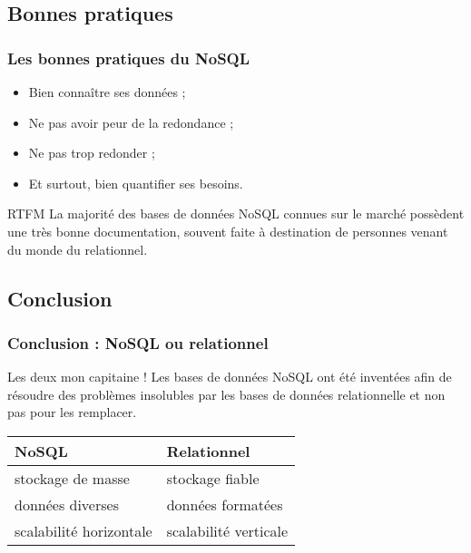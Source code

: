 	\subsection{Bonnes pratiques}
	\begin{frame}
		\frametitle{Les bonnes pratiques du NoSQL}

		\begin{itemize}
			\item Bien connaître ses données ;
			\item Ne pas avoir peur de la redondance ;
			\item Ne pas trop redonder ;
			\item Et surtout, bien quantifier ses besoins.
		\end{itemize}


		\begin{alertblock}{RTFM}
			La majorité des bases de données NoSQL connues sur le marché possèdent une très bonne documentation, souvent faite à destination de personnes venant du monde du relationnel.
		\end{alertblock}
	\end{frame}
	\subsection{Conclusion}
	\begin{frame}
		\frametitle{Conclusion : NoSQL ou relationnel}

		\begin{alertblock}{Les deux mon capitaine !}
			Les bases de données NoSQL ont été inventées afin de résoudre des problèmes insolubles par les bases de données relationnelle et non pas pour les remplacer.
		\end{alertblock}

		\vspace{20px}
		
		\begin{tabular}{|l|l|}
			\hline
			\textbf{NoSQL} & \textbf{Relationnel} \\ \hline\hline
			stockage de masse & stockage fiable \\ \hline
			données diverses & données formatées \\ \hline
			scalabilité horizontale & scalabilité verticale \\ \hline
		\end{tabular}

	\end{frame}

